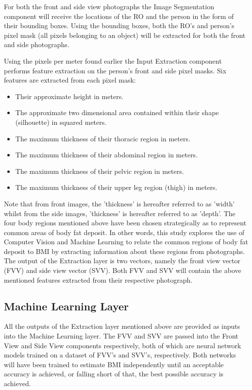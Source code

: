 \documentclass[conference]{IEEEtran}
\begin{document}
For both the front and side view photographs the Image Segmentation component will receive the locations of the RO and the person in the form of their bounding boxes.
Using the bounding boxes, both the RO's and person's pixel mask (all pixels belonging to an object) will be extracted for both the front and side photographs.

Using the pixels per meter found earlier the Input Extraction component performs feature extraction on the person's front and side pixel masks.
Six features are extracted from each pixel mask:
\begin{itemize}
	\item Their approximate height in meters.
	\item The approximate two dimensional area contained within their shape (silhouette) in squared meters.
	\item The maximum thickness of their thoracic region in meters.
	\item The maximum thickness of their abdominal region in meters.
	\item The maximum thickness of their pelvic region in meters.
	\item The maximum thickness of their upper leg region (thigh) in meters.	
\end{itemize}
Note that from front images, the 'thickness' is hereafter referred to as 'width' whilst from the side images, 'thickness' is hereafter referred to as 'depth'.
The four body regions mentioned above have been chosen strategically as to represent common areas of body fat deposit. %
In other words, this study explores the use of Computer Vision and Machine Learning to relate the common regions of body fat deposit to BMI by extracting information about these regions from photographs.
The output of the Extraction layer is two vectors, namely the front view vector (FVV) and side view vector (SVV).
Both FVV and SVV will contain the above mentioned features extracted from their respective photograph.

\subsection{Machine Learning Layer}
All the outputs of the Extraction layer mentioned above are provided as inputs into the Machine Learning layer.
The FVV and SVV are passed into the Front View and Side View components respectively, both of which are neural network models trained on a dataset of FVV's and SVV's, respectively.
Both networks will have been trained to estimate BMI independently until an acceptable accuracy is achieved, or falling short of that, the best possible accuracy is achieved.
\end{document}
